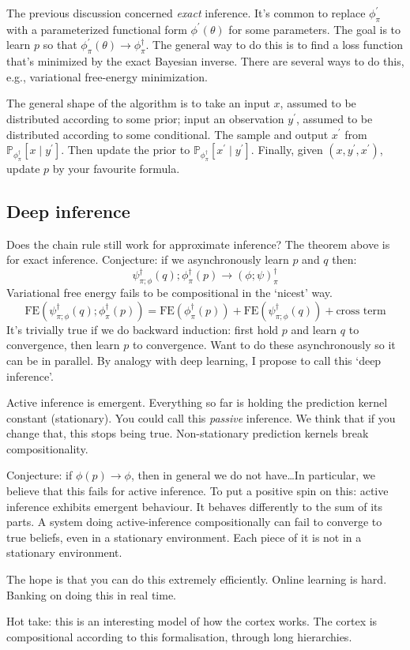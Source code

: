 The previous discussion concerned \emph{exact} inference.
It's common to replace $\phi^\prime_\pi$ with a parameterized functional form
$\phi^\prime(\theta)$ for some parameters.
The goal is to learn $p$ so that $\phi^\prime_\pi(\theta) \to \phi_\pi^\dagger$.
The general way to do this is to find a loss function that's minimized by the exact
Bayesian inverse.
There are several ways to do this, e.g., variational free-energy minimization.

The general shape of the algorithm is to take an input $x$, assumed to be distributed
according to some prior; input an observation $y^\prime$, assumed to be distributed
according to some conditional.
The sample and output $x^\prime$ from $\mathbb{P}_{\phi_\pi^\dagger} \left[ x \mid
    y^\prime \right]$.
Then update the prior to $\mathbb{P}_{\phi_\pi^\dagger} \left[ x^\prime \mid y^\prime
    \right]$.
Finally, given $(x, y^\prime, x^\prime)$, update $p$ by your favourite formula.

\subsection*{Deep inference}

Does the chain rule still work for approximate inference?
The theorem above is for exact inference.
Conjecture: if we asynchronously learn $p$ and $q$ then:
\begin{equation}
  \psi_{\pi; \phi}^\dagger(q); \phi_\pi^\dagger(p) \to (\phi; \psi)_\pi^\dagger
\end{equation}
Variational free energy fails to be compositional in the `nicest' way.
\begin{equation}
  \text{FE}(\psi_{\pi; \phi}^\dagger(q); \phi_\pi^\dagger(p)) =
  \text{FE}(\phi_\pi^\dagger(p)) +  \text{FE}(\psi_{\pi; \phi}^\dagger(q)) + \text{cross term}
\end{equation}
It's trivially true if we do backward induction: first hold $p$ and learn $q$ to
convergence, then learn $p$ to convergence.
Want to do these asynchronously so it can be in parallel.
By analogy with deep learning, I propose to call this `deep inference'.

Active inference is emergent.
Everything so far is holding the prediction kernel constant (stationary).
You could call this \emph{passive} inference.
We think that if you change that, this stops being true.
Non-stationary prediction kernels break compositionality.

Conjecture: if $\phi(p) \to \phi$, then in general we do not have\dots In particular,
we believe that this fails for active inference.
To put a positive spin on this: active inference exhibits emergent behaviour.
It behaves differently to the sum of its parts.
A system doing active-inference compositionally can fail to converge to true beliefs,
even in a stationary environment.
Each piece of it is not in a stationary environment.

The hope is that you can do this extremely efficiently.
Online learning is hard.
Banking on doing this in real time.

Hot take: this is an interesting model of how the cortex works.
The cortex is compositional according to this formalisation, through long hierarchies.
